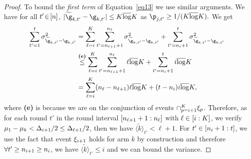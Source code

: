 \begin{proof}
To bound the \emph{first term} of Equation~\ref{eq13} we use similar arguments. 
We have
for all $t'\!\in\![n]$,
$|\estGainVector_{k,t'}-\gainVector_{k,t'}|
\leq 
\nArms\bar\log\nArms$ as $\learnerDist_{j,t'}\geq 1/(\nArms\bar\log\nArms).$
We get
\begin{align*}
\sum_{t'=1}^t \var_{\estGainVector_{k,t'}-\gainVector_{k,t'}}
&=%
\sum_{\ell=i}^{\nArms}
\sum_{t'=\phaseTime_{\ell+1}+1}^{\phaseTime_{\ell}}
\var_{\estGainVector_{k,t'}-\gainVector_{k,t'}}
+
\sum_{t'=\phaseTime_{i }+1}^{t}
\var_{\estGainVector_{k,t'}-\gainVector_{k,t'}}\\
&\stackrel{\textbf{(e)}}{\leq}
\sum_{\ell=i}^{\nArms}
\sum_{t'=\phaseTime_{\ell+1}+1}^{\phaseTime_{\ell}}
\ell\bar\log\nArms
+
\sum_{t'=\phaseTime_{i}+1}^{t}
i\bar\log\nArms\\
&=
\sum_{\ell=i}^{\nArms}
(\phaseTime_{\ell}-\phaseTime_{\ell+1})
\ell\bar\log\nArms
+
(t-\phaseTime_{i})
i\bar\log\nArms,
\end{align*}
where \textbf{(e)} is because we are on the conjunction of 
events  $\cap_{p=i+1}^{K} \xi_{p}$. Therefore, 
as for each round $t'$ in the round interval 
$[n_{\ell+1}+1:n_\ell]$  with $\ell\in [i:K]$, 
we verify $\mu_1-\mu_k<\Delta_{i +1}/2\leq\Delta_{\ell+1}/2$, 
then we have $\tilde{\langle k \rangle}_{t'}<\ell+1$. For 
$t'\in [n_{i}+1:t ]$, we use the fact that  event 
$ \xi_{i+1}$ holds for arm $k$ by construction and 
therefore $\forall t'\geq n_{i+1}\geq n_{i}$, we have
$\tilde{\langle k \rangle}_{t'}\leq i$ and we can bound the variance.


\end{proof}
